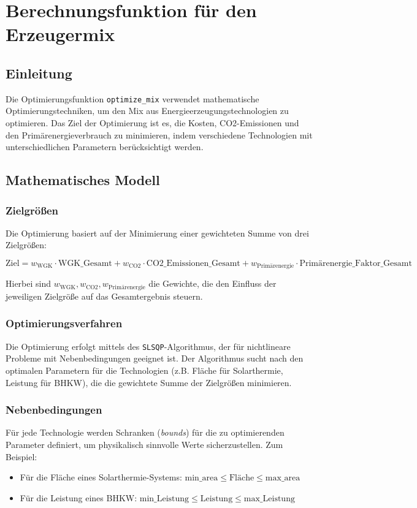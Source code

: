 \section{Berechnungsfunktion für den Erzeugermix}
\label{sec:optimize_mix_doc}

\subsection{Einleitung}
Die Optimierungsfunktion \texttt{optimize\_mix} verwendet mathematische Optimierungstechniken, um den Mix aus Energieerzeugungstechnologien zu optimieren. Das Ziel der Optimierung ist es, die Kosten, CO2-Emissionen und den Primärenergieverbrauch zu minimieren, indem verschiedene Technologien mit unterschiedlichen Parametern berücksichtigt werden.

\subsection{Mathematisches Modell}
\subsubsection{Zielgrößen}
Die Optimierung basiert auf der Minimierung einer gewichteten Summe von drei Zielgrößen:

\[
\text{Ziel} = w_{\text{WGK}} \cdot \text{WGK\_Gesamt} + w_{\text{CO2}} \cdot \text{CO2\_Emissionen\_Gesamt} + w_{\text{Primärenergie}} \cdot \text{Primärenergie\_Faktor\_Gesamt}
\]

Hierbei sind \( w_{\text{WGK}}, w_{\text{CO2}}, w_{\text{Primärenergie}} \) die Gewichte, die den Einfluss der jeweiligen Zielgröße auf das Gesamtergebnis steuern.


\subsubsection{Optimierungsverfahren}
Die Optimierung erfolgt mittels des \texttt{SLSQP}-Algorithmus, der für nichtlineare Probleme mit Nebenbedingungen geeignet ist. Der Algorithmus sucht nach den optimalen Parametern für die Technologien (z.B. Fläche für Solarthermie, Leistung für BHKW), die die gewichtete Summe der Zielgrößen minimieren.

\subsubsection{Nebenbedingungen}
Für jede Technologie werden Schranken (\emph{bounds}) für die zu optimierenden Parameter definiert, um physikalisch sinnvolle Werte sicherzustellen. Zum Beispiel:
\begin{itemize}
    \item Für die Fläche eines Solarthermie-Systems: \( \text{min\_area} \leq \text{Fläche} \leq \text{max\_area} \)
    \item Für die Leistung eines BHKW: \( \text{min\_Leistung} \leq \text{Leistung} \leq \text{max\_Leistung} \)
\end{itemize}


